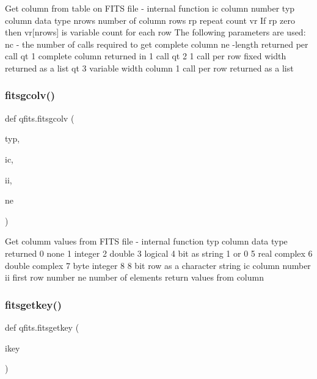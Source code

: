 \begin{DoxyVerb}Get column from table on FITS file - internal function
    ic        column number
    typ       column data type
    nrows     number of column rows
    rp        repeat count
    vr        If rp zero then vr[nrows] is variable count for each row
The following parameters are used:
    nc - the number of calls required to get complete column
    ne -length returned per call
    qt 1 complete column returned in 1 call
    qt 2 1 call per row fixed width returned as a list
    qt 3 variable width column 1 call per row returned as a list
\end{DoxyVerb}
 \mbox{\label{namespaceqfits_abb185e590203be183a2b025b89c27599}} 
\subsubsection{\texorpdfstring{fitsgcolv()}{fitsgcolv()}}
{\footnotesize\ttfamily def qfits.\+fitsgcolv (\begin{DoxyParamCaption}\item[{}]{typ,  }\item[{}]{ic,  }\item[{}]{ii,  }\item[{}]{ne }\end{DoxyParamCaption})}

\begin{DoxyVerb}Get columm values from FITS file - internal function
    typ       column data type returned
        0   none
        1   integer
        2   double
        3   logical
        4   bit as string 1 or 0
        5   real complex
        6   double complex
        7   byte integer 8
        8   bit row as a character string
    ic        column number
    ii        first row number
    ne        number of elements
return        values from column
\end{DoxyVerb}
 \mbox{\label{namespaceqfits_a3869b276d00a536ba46704675d677ce2}} 
\subsubsection{\texorpdfstring{fitsgetkey()}{fitsgetkey()}}
{\footnotesize\ttfamily def qfits.\+fitsgetkey (\begin{DoxyParamCaption}\item[{}]{ikey }\end{DoxyParamCaption})}

